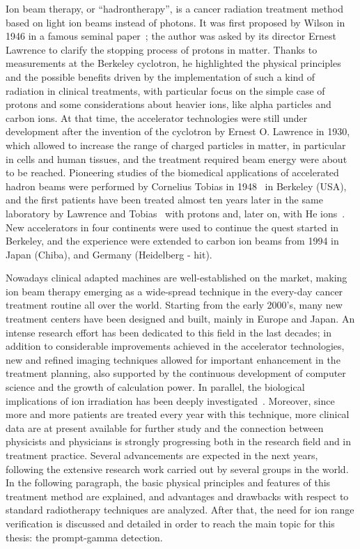Ion beam therapy, or \enquote{hadrontherapy}, is a cancer radiation treatment method based on light ion beams instead of photons. It was first proposed by Wilson in 1946 in a famous seminal paper~\parencite{Wilson1946}; the author was asked by its director Ernest Lawrence to clarify the stopping process of protons in matter. Thanks to measurements at the Berkeley cyclotron, he highlighted the physical principles and the possible benefits driven by the implementation of such a kind of radiation in clinical treatments, with particular focus on the simple case of protons and some considerations about heavier ions, like alpha particles and carbon ions.  At that time, the accelerator technologies were still under development after the invention of the cyclotron by Ernest O. Lawrence in 1930, which allowed to increase the range of charged particles in matter, in particular in cells and human tissues, and the treatment required beam energy were about to be reached. Pioneering studies of the biomedical applications of accelerated hadron beams were performed by Cornelius Tobias in 1948~\parencite{Blakely2009} in Berkeley (USA), and the first patients have been treated almost ten years later in the same laboratory by Lawrence and Tobias~\parencite{Tobias1955, Tobias1958} with protons and, later on, with He ions~\parencite{Halperin2006}. New accelerators in four continents were used to continue the quest started in Berkeley, and the experience were extended to carbon ion beams from 1994 in Japan (Chiba), and Germany (Heidelberg - \gls{hit}). 

Nowadays clinical adapted machines are well-established on the market, making ion beam therapy emerging as a wide-spread technique in the every-day cancer treatment routine all over the world. Starting from the early 2000's, many new treatment centers have been designed and built, mainly in Europe and Japan. An intense research effort has been dedicated to this field in the last decades; in addition to considerable improvements achieved in the accelerator technologies, new and refined imaging techniques allowed for important enhancement in the treatment planning, also supported by the continuous development of computer science and the growth of calculation power. In parallel, the biological implications of ion irradiation has been deeply investigated~\parencite{Tobias1982, Brahme2004, Friedrich2012, }. Moreover, since more and more patients are treated every year with this technique, more clinical data are at present available for further study and the connection between physicists and physicians is strongly progressing both in the research field and in treatment practice. Several advancements are expected in the next years, following the extensive research work carried out by several groups in the world. In the following paragraph, the basic physical principles and features of this treatment method are explained, and advantages and drawbacks with respect to standard radiotherapy techniques are analyzed. After that, the need for ion range verification is discussed and detailed in order to reach the main topic for this thesis: the prompt-gamma detection.   

